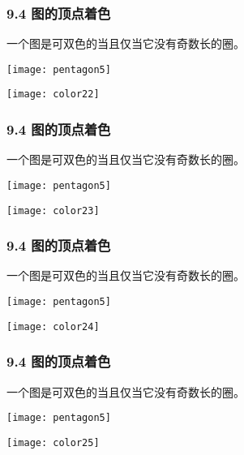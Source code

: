 \documentclass{beamer}
\begin{document}
\begin{CJK}{UTF8}{gbsn}
\begin{frame}
  \frametitle{9.4 图的顶点着色}
  \begin{Thm2}
    一个图是可双色的当且仅当它没有奇数长的圈。
  \end{Thm2}
\vspace{1cm}
  \begin{minipage}{0.45\linewidth}
\texttt{[image: pentagon5]}    
  \end{minipage}
  \begin{minipage}{0.45\linewidth}
    \texttt{[image: color22]}
  \end{minipage}
\end{frame}
\begin{frame}
  \frametitle{9.4 图的顶点着色}
  \begin{Thm2}
    一个图是可双色的当且仅当它没有奇数长的圈。
  \end{Thm2}
\vspace{1cm}
  \begin{minipage}{0.45\linewidth}
\texttt{[image: pentagon5]}    
  \end{minipage}
  \begin{minipage}{0.45\linewidth}
    \texttt{[image: color23]}
  \end{minipage}
\end{frame}
\begin{frame}
  \frametitle{9.4 图的顶点着色}
  \begin{Thm2}
    一个图是可双色的当且仅当它没有奇数长的圈。
  \end{Thm2}
\vspace{1cm}
  \begin{minipage}{0.45\linewidth}
\texttt{[image: pentagon5]}    
  \end{minipage}
  \begin{minipage}{0.45\linewidth}
    \texttt{[image: color24]}
  \end{minipage}
\end{frame}
\begin{frame}
  \frametitle{9.4 图的顶点着色}
  \begin{Thm2}
    一个图是可双色的当且仅当它没有奇数长的圈。
  \end{Thm2}
\vspace{1cm}
  \begin{minipage}{0.45\linewidth}
\texttt{[image: pentagon5]}    
  \end{minipage}
  \begin{minipage}{0.45\linewidth}
    \texttt{[image: color25]}
  \end{minipage}
\end{frame}


\end{CJK}
\end{document}
